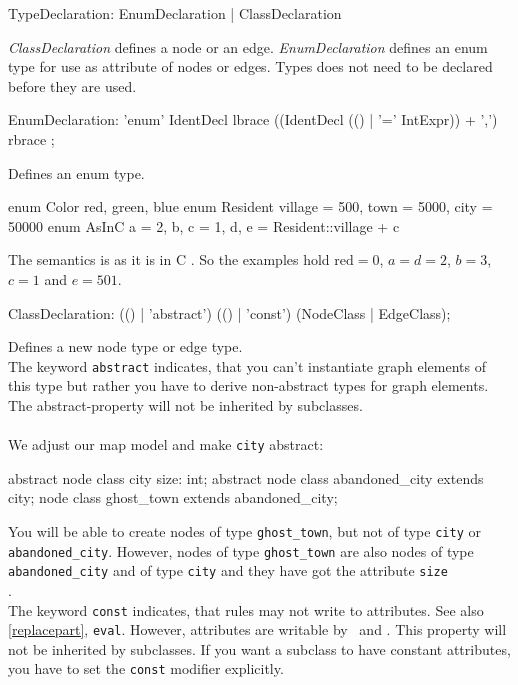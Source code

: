 \begin{rail}
  TypeDeclaration: EnumDeclaration | ClassDeclaration
\end{rail}
\emph{ClassDeclaration} defines a node or an edge. \emph{EnumDeclaration} defines an enum type for use as attribute of nodes or edges. Types does not need to be declared before they are used.

\begin{rail}
  EnumDeclaration: 'enum' IdentDecl lbrace ((IdentDecl (() | '=' IntExpr)) + ',') rbrace ;
\end{rail}
Defines an enum type.\\
\begin{grgen}
enum Color {red, green, blue}
enum Resident {village = 500, town = 5000, city = 50000}
enum AsInC {a = 2, b, c = 1, d, e = Resident::village + c}
\end{grgen}
{\small The semantics is as it is in C \cite{isoc}. So the examples hold $\text{red} = 0$, $a=d=2$, $b=3$, $c=1$ and $e=501$.\\}

\begin{rail}  
  ClassDeclaration: (() | 'abstract') (() | 'const') (NodeClass | EdgeClass);
\end{rail}
Defines a new node type or edge type.\\
The keyword \texttt{abstract} indicates, that you can't instantiate graph elements of this type but rather you have to derive non-abstract types for graph elements. The abstract-property will not be inherited by subclasses.\\
{\small \\We adjust our map model and make \texttt{city} abstract:}
\begin{grgen}
abstract node class city {
	size: int;
}
abstract node class abandoned_city extends city;
node class ghost_town extends abandoned_city;
\end{grgen}
{\small You will be able to create nodes of type \texttt{ghost\_town}, but not of type \texttt{city} or \texttt{abandoned\_city}. However, nodes of type \texttt{ghost\_town} are also nodes of type \texttt{abandoned\_city} and of type \texttt{city} and they have got the attribute \texttt{size}\\}.
\\
The keyword \texttt{const} indicates, that rules may not write to attributes. See also \ref{replacepart}, \texttt{eval}. However, attributes are writable by \LibGr\ and \GrShell. This property will not be inherited by subclasses. If you want a subclass to have constant attributes, you have to set the \texttt{const} modifier explicitly.

